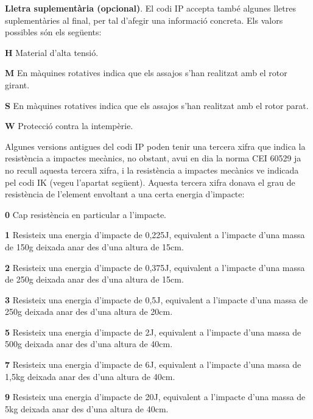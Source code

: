 \textbf{Lletra suplementària (opcional)}. El codi IP accepta també algunes
lletres suplementàries al final, per tal d'afegir una informació concreta. Els valors
possibles són els següents:
\begin{list}{}
   {\setlength{\labelwidth}{10mm} \setlength{\leftmargin}{10mm} \setlength{\labelsep}{2mm}}
   \item[\textbf{H}] Material d'alta tensió.
   \item[\textbf{M}] En màquines rotatives indica que els assajos s'han realitzat amb el
    rotor girant.
   \item[\textbf{S}] En màquines rotatives indica que els assajos s'han realitzat amb el
    rotor parat.
   \item[\textbf{W}] Protecció contra la intempèrie.
\end{list}


Algunes versions antigues del codi IP poden tenir una tercera xifra que indica la resistència a impactes mecànics, no obstant, avui en dia la norma CEI 60529 ja no recull aquesta tercera xifra, i la resistència a impactes mecànics ve indicada pel codi IK (vegeu l'apartat següent). Aquesta tercera xifra donava el grau de resistència de l'element envoltant a una certa energia d'impacte:
\begin{list}{}
   {\setlength{\labelwidth}{10mm} \setlength{\leftmargin}{10mm} \setlength{\labelsep}{2mm}}
   \item[\textbf{0}] Cap resistència en particular a l'impacte.
   \item[\textbf{1}] Resisteix una energia d'impacte de 0,225\unit{J}, equivalent a l'impacte d'una massa de 150\unit{g} deixada anar des d'una altura de 15\unit{cm}.
   \item[\textbf{2}] Resisteix una energia d'impacte de 0,375\unit{J}, equivalent a l'impacte d'una massa de 250\unit{g} deixada anar des d'una altura de 15\unit{cm}.
   \item[\textbf{3}] Resisteix una energia d'impacte de 0,5\unit{J}, equivalent a l'impacte d'una massa de 250\unit{g} deixada anar des d'una altura de 20\unit{cm}.
   \item[\textbf{5}] Resisteix una energia d'impacte de 2\unit{J}, equivalent a l'impacte d'una massa de 500\unit{g} deixada anar des d'una altura de 40\unit{cm}.
   \item[\textbf{7}] Resisteix una energia d'impacte de 6\unit{J}, equivalent a l'impacte d'una massa de 1,5\unit{kg} deixada anar des d'una altura de 40\unit{cm}.
   \item[\textbf{9}]Resisteix una energia d'impacte de 20\unit{J}, equivalent a l'impacte d'una massa de 5\unit{kg} deixada anar des d'una altura de 40\unit{cm}.
\end{list}

